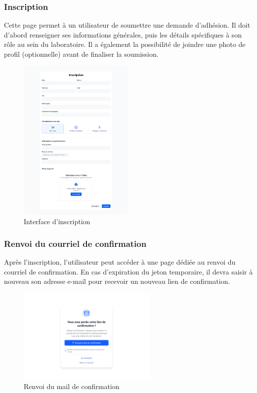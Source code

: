 \subsubsection{Inscription}

Cette page permet à un utilisateur de soumettre une demande d’adhésion. Il doit d’abord renseigner ses informations générales, puis les détails spécifiques à son rôle au sein du laboratoire. Il a également la possibilité de joindre une photo de profil (optionnelle) avant de finaliser la soumission.

\begin{figure}[H]
    \centering
    \includegraphics[width=0.5\textwidth]{images/interface/inscription.png}
    \caption{Interface d’inscription}
    \label{fig:inscription}
\end{figure}

\subsubsection{Renvoi du courriel de confirmation}

Après l’inscription, l’utilisateur peut accéder à une page dédiée au renvoi du courriel de confirmation. En cas d’expiration du jeton temporaire, il devra saisir à nouveau son adresse e-mail pour recevoir un nouveau lien de confirmation.

\begin{figure}[H]
    \centering
    \includegraphics[width=0.6\textwidth]{images/interface/renvoie_mail.png}
    \caption{Renvoi du mail de confirmation}
    \label{fig:renvoie_mail}
\end{figure}

